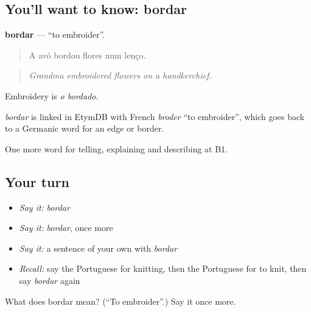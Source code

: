\subsection*{You'll want to know: bordar}
\textbf{bordar} — \textquotedblleft{}to embroider\textquotedblright{}.

\begin{quote}
A avó bordou flores num lenço.
\end{quote}

\begin{quote}
\emph{Grandma embroidered flowers on a handkerchief.}
\end{quote}

Embroidery is \emph{o bordado}.

\begin{cousinweb}
\emph{bordar} is linked in EtymDB with French \emph{broder} \textquotedblleft{}to embroider\textquotedblright{}, which goes back to a Germanic word for an edge or border.
\end{cousinweb}

\begin{grammarlens}[title={What you've built}]
One more word for telling, explaining and describing at B1.
\end{grammarlens}

\subsection*{Your turn}
\begin{itemize}
\raggedright
  \item \emph{Say it:} \emph{bordar}
  \item \emph{Say it:} \emph{bordar}, once more
  \item \emph{Say it:} a sentence of your own with \emph{bordar}
  \item \emph{Recall:} say the Portuguese for knitting, then the Portuguese for to knit, then say \emph{bordar} again
\end{itemize}

\begin{tcolorbox}[breakable,colback=teal!4,colframe=teal!35!black,title={Before you move on}]
What does bordar mean? (\textquotedblleft{}To embroider\textquotedblright{}.) Say it once more.
\end{tcolorbox}
